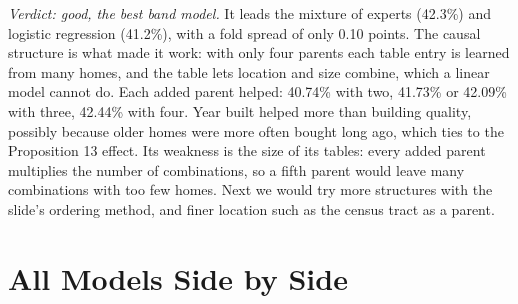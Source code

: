 \documentclass[sigconf,nonacm,10pt]{acmart}
\begin{document}
\emph{Verdict: good, the best band model.} It leads the mixture of experts (42.3\%) and logistic regression (41.2\%), with a fold spread of only 0.10 points. The causal structure is what made it work: with only four parents each table entry is learned from many homes, and the table lets location and size combine, which a linear model cannot do. Each added parent helped: 40.74\% with two, 41.73\% or 42.09\% with three, 42.44\% with four. Year built helped more than building quality, possibly because older homes were more often bought long ago, which ties to the Proposition 13 effect. Its weakness is the size of its tables: every added parent multiplies the number of combinations, so a fifth parent would leave many combinations with too few homes. Next we would try more structures with the slide's ordering method, and finer location such as the census tract as a parent.

\section{All Models Side by Side}
\label{sec:all}
\end{document}
